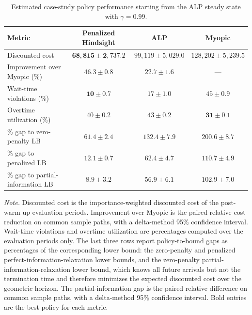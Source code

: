 \begin{table}[!htbp]
\centering
\begin{threeparttable}
\caption{Estimated case-study policy performance starting from the ALP steady state with $\gamma=0.99$.}
\label{tab:saure_ejor_steady_state}

\scriptsize
\setlength{\tabcolsep}{2.4pt}
\renewcommand{\arraystretch}{1.15}

\begin{tabular*}{\textwidth}{@{\extracolsep{\fill}} lccc @{}}
\toprule
Metric & Penalized Hindsight & ALP & Myopic \\
\midrule
Discounted cost & \(\mathbf{68{,}815 \pm 2{,}737.2}\) & \(99{,}119 \pm 5{,}029.0\) & \(128{,}202 \pm 5{,}239.5\) \\
Improvement over Myopic (\%) & \(\mathbf{46.3 \pm 0.8}\) & \(22.7 \pm 1.6\) & --- \\
Wait-time violations (\%) & \(\mathbf{10 \pm 0.7}\) & \(17 \pm 1.0\) & \(45 \pm 0.9\) \\
Overtime utilization (\%) & \(40 \pm 0.2\) & \(43 \pm 0.2\) & \(\mathbf{31 \pm 0.1}\) \\
\% gap to zero-penalty LB & \(\mathbf{61.4 \pm 2.4}\) & \(132.4 \pm 7.9\) & \(200.6 \pm 8.7\) \\
\% gap to penalized LB & \(\mathbf{12.1 \pm 0.7}\) & \(62.4 \pm 4.7\) & \(110.7 \pm 4.9\) \\
\% gap to partial-information LB & \(\mathbf{8.9 \pm 3.2}\) & \(56.9 \pm 6.1\) & \(102.9 \pm 7.0\) \\
\bottomrule
\end{tabular*}

\begin{tablenotes}[flushleft]
\footnotesize
\item \textit{Note.} Discounted cost is the importance-weighted discounted cost of the post-warm-up evaluation periods. Improvement over Myopic is the paired relative cost reduction on common sample paths, with a delta-method 95\% confidence interval. Wait-time violations and overtime utilization are percentages computed over the evaluation periods only. The last three rows report policy-to-bound gaps as percentages of the corresponding lower bound: the zero-penalty and penalized perfect-information-relaxation lower bounds, and the zero-penalty partial-information-relaxation lower bound, which knows all future arrivals but not the termination time and therefore minimizes the expected discounted cost over the geometric horizon. The partial-information gap is the paired relative difference on common sample paths, with a delta-method 95\% confidence interval. Bold entries are the best policy for each metric.
\end{tablenotes}
\end{threeparttable}
\end{table}